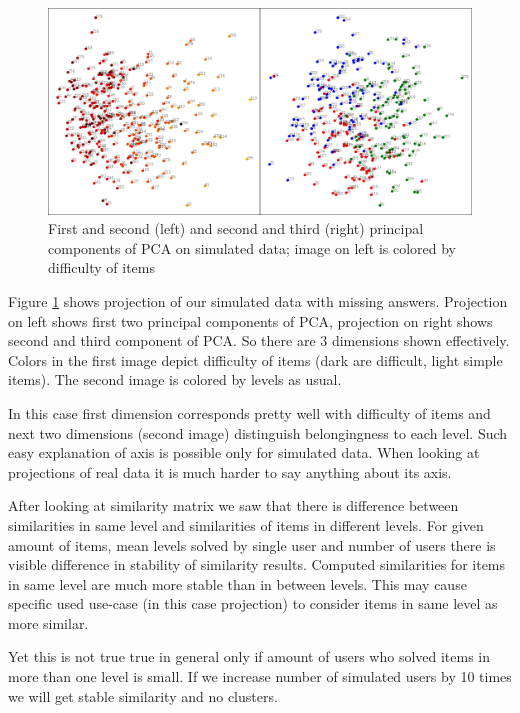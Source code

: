 \documentclass[
  digital, %
  table,   %
  nolof,     %
  nolot,     %
  nocover,
  color
]{fithesis3}
\begin{document}

\begin{figure}
  \includegraphics[width=\textwidth]{img/simulated_missing}
  \caption{First and second (left) and second and third (right) principal components of PCA on simulated data; image on left is colored by difficulty of items}
  \label{fig:simulated_missing}
\end{figure}

Figure \ref{fig:simulated_missing} shows projection of our simulated data with missing answers. Projection on left shows first two principal components of PCA, projection on right shows second and third component of PCA. So there are 3 dimensions shown effectively. Colors in the first image depict difficulty of items (dark are difficult, light simple items). The second image is colored by levels as usual.

In this case first dimension corresponds pretty well with difficulty of items and next two dimensions (second image) distinguish belongingness to each level. Such easy explanation of axis is possible only for simulated data. When looking at projections of real data it is much harder to say anything about its axis.

After looking at similarity matrix we saw that there is difference between similarities in same level and similarities of items in different levels. For given amount of items, mean levels solved by single user and number of users there is visible difference in stability of similarity results. Computed similarities for items in same level are much more stable than in between levels. This may cause specific used use-case (in this case projection) to consider items in same level as more similar.

Yet this is not true true in general only if amount of users who solved items in more than one level is small. If we increase number of simulated users by 10 times we will get stable similarity and no clusters.
\end{document}
